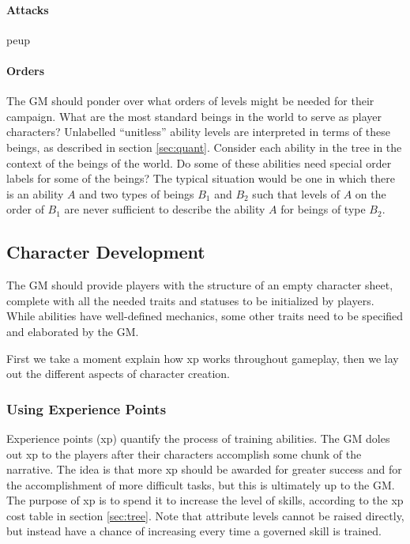 \documentclass[12pt]{article}
\newcommand{\notes}[1]{{\color{Tan} #1}}
\begin{document}
\paragraph{Attacks}
\notes{peup}

\paragraph{Orders}
The GM should ponder over what orders of levels might be needed for their campaign.
What are the most standard beings in the world to serve as player characters?
Unlabelled ``unitless'' ability levels are interpreted in terms of these beings,
as described in section \ref{sec:quant}.
Consider each ability in the tree in the context of the beings of the world.
Do some of these abilities need special order labels for some of the beings?
The typical situation would be one in which there is an ability $A$ and
two types of beings $B_1$ and $B_2$ such that
levels of $A$ on the order of $B_1$ are never sufficient
to describe the ability $A$ for beings of type $B_2$.


\subsection{Character Development}\label{sec:dev}

The GM should provide players with the structure of an empty character sheet,
complete with all the needed traits and statuses to be initialized by players.
While abilities have well-defined mechanics, some other traits
need to be specified and elaborated by the GM.

First we take a moment explain how xp works throughout gameplay,
then we lay out the different aspects of character creation.

\subsubsection{Using Experience Points}
Experience points (xp) quantify the process of training abilities.
The GM doles out xp to the players after their characters accomplish some chunk of the narrative.
The idea is that more xp should be awarded for greater success and for the accomplishment of more difficult tasks,
but this is ultimately up to the GM.
The purpose of xp is to spend it to increase the level of skills, according to the xp cost table in section \ref{sec:tree}.
Note that attribute levels cannot be raised directly, but instead have a chance of increasing every time a governed skill is trained.
\end{document}
